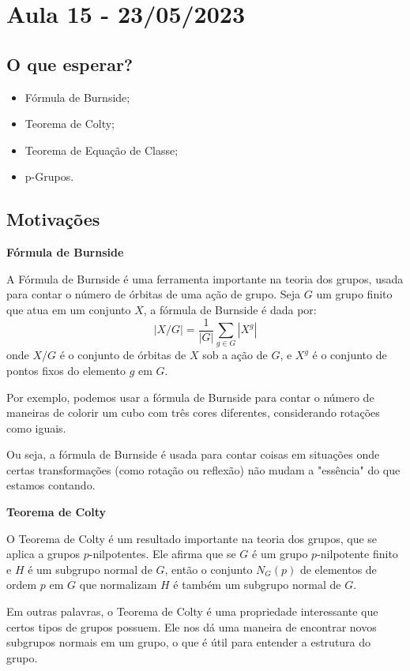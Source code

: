 \documentclass{article}
\begin{document}
\section{Aula 15 - 23/05/2023}
\subsection{O que esperar?}
\begin{itemize}
  \item Fórmula de Burnside;
  \item Teorema de Colty;
  \item Teorema de Equa\c cão de Classe;
  \item p-Grupos.
\end{itemize}
\subsection{Motiva\c cões}

\par\textbf{Fórmula de Burnside} 

A Fórmula de Burnside é uma ferramenta importante na teoria dos grupos, usada para contar o número de órbitas de uma ação de grupo. Seja $G$ um grupo finito que atua em um conjunto $X$, a fórmula de Burnside é dada por:
\[
|X/G| = \frac{1}{|G|} \sum_{g \in G} |X^g|
\]
onde $X/G$ é o conjunto de órbitas de $X$ sob a ação de $G$, e $X^g$ é o conjunto de pontos fixos do elemento $g$ em $G$. 

Por exemplo, podemos usar a fórmula de Burnside para contar o número de
maneiras de colorir um cubo com três cores diferentes, considerando rotações
como iguais. 

Ou seja, a fórmula de Burnside é usada para contar coisas em situações onde certas transformações
(como rotação ou reflexão) não mudam a "essência" do que estamos contando.

\textbf{Teorema de Colty}

O Teorema de Colty é um resultado importante na teoria dos grupos, que se aplica a grupos $p$-nilpotentes. Ele afirma que se $G$ é um grupo $p$-nilpotente finito e $H$ é um subgrupo normal de $G$, então o conjunto $N_G(p)$ de elementos de ordem $p$ em $G$ que normalizam $H$ é também um subgrupo normal de $G$. 

Em outras palavras, o Teorema de Colty é uma propriedade interessante que certos
tipos de grupos possuem. Ele nos dá uma maneira de encontrar novos subgrupos
normais em um grupo, o que é útil para entender a estrutura do grupo.
\end{document}
